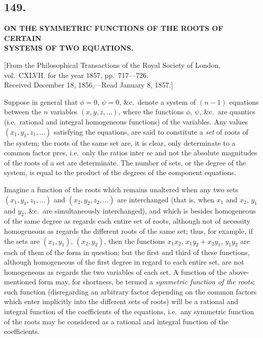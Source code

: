 \documentclass[11pt,a4paper]{book}
\begin{document}
\begin{center}
\newpage
\section*{149.}
\begin{center}
\Large\bfseries
ON THE SYMMETRIC FUNCTIONS OF THE ROOTS OF CERTAIN\\SYSTEMS OF TWO EQUATIONS.
\end{center}

\begin{flushright}
\small
[From the Philosophical Transactions of the Royal Society of London,\\
vol.~CXLVII. for the year 1857, pp.~717---726.\\
Received December 18, 1856,---Read January 8, 1857.]
\end{flushright}

\normalsize

Suppose in general that $\phi = 0$, $\psi = 0$, \&c.\ denote a system of
$(n - 1)$ equations between the $n$ variables $(x, y, z, \ldots)$, where the
functions $\phi$, $\psi$, \&c.\ are quantics (i.e.\ rational and integral
homogeneous functions) of the variables. Any values $(x_1, y_1, z_1, \ldots)$
satisfying the equations, are said to constitute a \emph{set} of roots of the
system; the roots of the same set are, it is clear, only determinate to a
common factor pres, i.e.\ only the ratios inter se and not the absolute
magnitudes of the roots of a set are determinate. The number of sets, or the
degree of the system, is equal to the product of the degrees of the component
equations.

Imagine a function of the roots which remains unaltered when any two sets
$(x_1, y_1, z_1, \ldots)$ and $(x_2, y_2, z_2, \ldots)$ are interchanged
(that is, when $x_1$ and $x_2$, $y_1$ and $y_2$, \&c.\ are simultaneously
interchanged), and which is besides homogeneous of the same degree as regards
each entire set of roots, although not of necessity homogeneous as regards the
different roots of the same set; thus, for example, if the sets are
$(x_1, y_1)$, $(x_2, y_2)$, then the functions $x_1 x_2$,
$x_1 y_2 + x_2 y_1$, $y_1 y_2$ are each of them of the form in question; but
the first and third of these functions, although homogeneous of the first
degree in regard to each entire set, are not homogeneous as regards the two
variables of each set. A function of the above-mentioned form may, for
shortness, be termed a \emph{symmetric function of the roots}; such function
(disregarding an arbitrary factor depending on the common factors which enter
implicitly into the different sets of roots) will be a rational and integral
function of the coefficients of the equations, i.e.\ any symmetric function of
the roots may be considered as a rational and integral function of the
coefficients.


\end{center}
\end{document}
